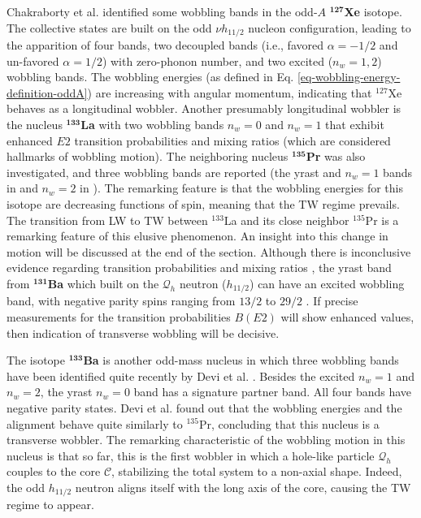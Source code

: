 Chakraborty et al. \cite{chakraborty2020multiphonon} identified some wobbling bands in the odd-$A$ $^\mathbf{127}$\textbf{Xe} isotope. The collective states are built on the odd $\nu h_{11/2}$ nucleon configuration, leading to the apparition of four bands, two decoupled bands (i.e., favored $\alpha=-1/2$ and un-favored $\alpha=1/2$) with zero-phonon number, and two excited ($n_w=1,2$) wobbling bands. The wobbling energies (as defined in Eq. \ref{eq-wobbling-energy-definition-oddA}) are increasing with angular momentum, indicating that $^{127}$Xe behaves as a longitudinal wobbler. Another presumably longitudinal wobbler is the nucleus $^\mathbf{133}$\textbf{La} \cite{biswas2019longitudinal} with two wobbling bands $n_w=0$ and $n_w=1$ that exhibit enhanced $E2$ transition probabilities and mixing ratios (which are considered hallmarks of wobbling motion). The neighboring nucleus $^\mathbf{135}$\textbf{Pr} was also investigated, and three wobbling bands are reported (the yrast and $n_w=1$ bands in \cite{matta2017transverse} and $n_w=2$ in \cite{sensharma2019two}). The remarking feature is that the wobbling energies for this isotope are decreasing functions of spin, meaning that the TW regime prevails. The transition from LW to TW between $^{133}$La and its close neighbor $^{135}$Pr is a remarking feature of this elusive phenomenon. An insight into this change in motion will be discussed at the end of the section. Although there is inconclusive evidence regarding transition probabilities and mixing ratios \cite{ma1990competing,kaur2014high}, the yrast band from $^\mathbf{131}$\textbf{Ba} which built on the $\mathcal{Q}_h$ neutron ($h_{11/2}$) can have an excited wobbling band, with negative parity spins ranging from $13/2$ to $29/2$ \cite{petrache_2018}. If precise measurements for the transition probabilities $B(E2)$ will show enhanced values, then indication of transverse wobbling will be decisive.

The isotope $^\mathbf{133}$\textbf{Ba} is another odd-mass nucleus in which three wobbling bands have been identified quite recently by Devi et al. \cite{devi2021observation}. Besides the excited $n_w=1$ and $n_w=2$, the yrast $n_w=0$ band has a signature partner band. All four bands have negative parity states. Devi et al. found out that the wobbling energies and the alignment behave quite similarly to $^{135}$Pr, concluding that this nucleus is a transverse wobbler. The remarking characteristic of the wobbling motion in this nucleus is that so far, this is the first wobbler in which a hole-like particle $\mathcal{Q}_h$ couples to the core $\mathscr{C}$, stabilizing the total system to a non-axial shape. Indeed, the odd $h_{11/2}$ neutron aligns itself with the long axis of the core, causing the TW regime to appear.

